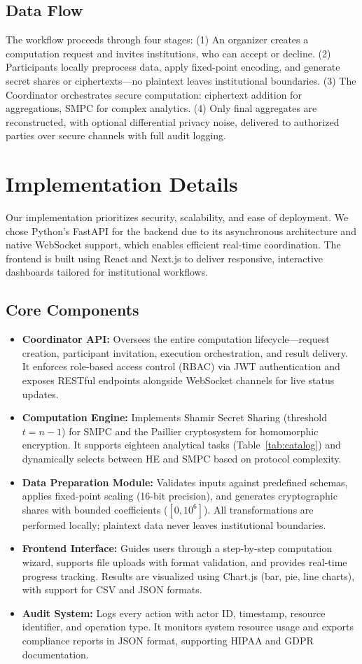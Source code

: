 \documentclass[conference]{IEEEtran}
\begin{document}
\subsection{Data Flow}
The workflow proceeds through four stages: (1) An organizer creates a computation request and invites institutions, who can accept or decline. (2) Participants locally preprocess data, apply fixed-point encoding, and generate secret shares or ciphertexts—no plaintext leaves institutional boundaries. (3) The Coordinator orchestrates secure computation: ciphertext addition for aggregations, SMPC for complex analytics. (4) Only final aggregates are reconstructed, with optional differential privacy noise, delivered to authorized parties over secure channels with full audit logging.

\section{Implementation Details}
Our implementation prioritizes security, scalability, and ease of deployment. We chose Python's FastAPI for the backend due to its asynchronous architecture and native WebSocket support, which enables efficient real-time coordination. The frontend is built using React and Next.js to deliver responsive, interactive dashboards tailored for institutional workflows.

\subsection{Core Components}
\begin{itemize}
    \item \textbf{Coordinator API:} Oversees the entire computation lifecycle—request creation, participant invitation, execution orchestration, and result delivery. It enforces role-based access control (RBAC) via JWT authentication and exposes RESTful endpoints alongside WebSocket channels for live status updates.
    \item \textbf{Computation Engine:} Implements Shamir Secret Sharing (threshold $t = n-1$) for SMPC and the Paillier cryptosystem for homomorphic encryption. It supports eighteen analytical tasks (Table~\ref{tab:catalog}) and dynamically selects between HE and SMPC based on protocol complexity.
    \item \textbf{Data Preparation Module:} Validates inputs against predefined schemas, applies fixed-point scaling (16-bit precision), and generates cryptographic shares with bounded coefficients ($[0, 10^6]$). All transformations are performed locally; plaintext data never leaves institutional boundaries.
    \item \textbf{Frontend Interface:} Guides users through a step-by-step computation wizard, supports file uploads with format validation, and provides real-time progress tracking. Results are visualized using Chart.js (bar, pie, line charts), with support for CSV and JSON formats.
    \item \textbf{Audit System:} Logs every action with actor ID, timestamp, resource identifier, and operation type. It monitors system resource usage and exports compliance reports in JSON format, supporting HIPAA and GDPR documentation.
\end{itemize}
\end{document}
